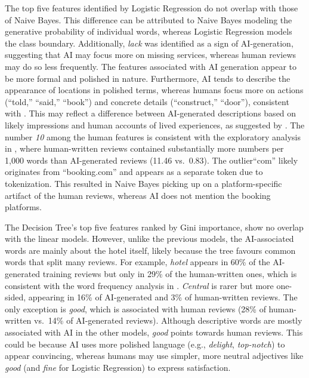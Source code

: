 \documentclass[pmlr]{jmlr}%
\begin{document}
The top five features identified by Logistic Regression do not overlap with those of Naive Bayes.
This difference can be attributed to Naive Bayes modeling the generative probability of individual words, whereas Logistic Regression models the class boundary.
Additionally, \emph{lack} was identified as a sign of AI-generation, suggesting that AI may focus more on missing services, whereas human reviews may do so less frequently.
The features associated with AI generation appear to be more formal and polished in nature.
Furthermore, AI tends to describe the appearance of locations in polished terms, whereas humans focus more on actions (``told,'' ``said,'' ``book'') and concrete details (``construct,'' ``door''), consistent with \citet{Zhao2025}.
This may reflect a difference between AI-generated descriptions based on likely impressions and human accounts of lived experiences, as suggested by \citet{Ignat2025}.
The number \emph{10} among the human features is consistent with the exploratory analysis in , where human-written reviews contained substantially more numbers per 1,000 words than AI-generated reviews (11.46 vs.\ 0.83).
The outlier``com'' likely originates from ``booking.com'' and appears as a separate token due to tokenization. 
This resulted in Naive Bayes picking up on a platform-specific artifact of the human reviews, whereas AI does not mention the booking platforms.

The Decision Tree's top five features ranked by Gini importance, show no overlap with the linear models.
However, unlike the previous models, the AI-associated words are mainly about the hotel itself, likely because the tree favours common words that split many reviews.
For example, \emph{hotel} appears in 60\% of the AI-generated training reviews but only in 29\% of the human-written ones, which is consistent with the word frequency analysis in .
\emph{Central} is rarer but more one-sided, appearing in 16\% of AI-generated and 3\% of human-written reviews.
The only exception is \emph{good}, which is associated with human reviews (28\% of human-written vs.\ 14\% of AI-generated reviews).
Although descriptive words are mostly associated with AI in the other models, \emph{good} points towards human reviews. This could be because AI uses more polished language (e.g., \emph{delight}, \emph{top-notch}) to appear convincing, whereas humans may use simpler, more neutral adjectives like \emph{good} (and \emph{fine} for Logistic Regression) to express satisfaction.
\end{document}

